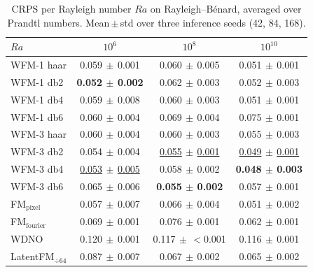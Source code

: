 \begin{table}[ht]
\centering
\caption{CRPS per Rayleigh number $Ra$ on Rayleigh--B\'enard, averaged over Prandtl numbers. Mean\,$\pm$\,std over three inference seeds (42, 84, 168).}
\label{tab:ablation_rb_crps_ra}
\begin{tabular}{lccc}
\toprule
$Ra$ & $10^{6}$ & $10^{8}$ & $10^{10}$ \\
\midrule
WFM-1 haar & 0.059{\scriptsize$\,\pm\,$0.001} & 0.060{\scriptsize$\,\pm\,$0.005} & 0.051{\scriptsize$\,\pm\,$0.001} \\
WFM-1 db2 & \textbf{0.052{\scriptsize$\,\pm\,$0.002}} & 0.062{\scriptsize$\,\pm\,$0.003} & 0.052{\scriptsize$\,\pm\,$0.003} \\
WFM-1 db4 & 0.059{\scriptsize$\,\pm\,$0.008} & 0.060{\scriptsize$\,\pm\,$0.003} & 0.051{\scriptsize$\,\pm\,$0.001} \\
WFM-1 db6 & 0.060{\scriptsize$\,\pm\,$0.004} & 0.069{\scriptsize$\,\pm\,$0.004} & 0.075{\scriptsize$\,\pm\,$0.001} \\
\midrule
WFM-3 haar & 0.060{\scriptsize$\,\pm\,$0.004} & 0.060{\scriptsize$\,\pm\,$0.003} & 0.055{\scriptsize$\,\pm\,$0.003} \\
WFM-3 db2 & 0.054{\scriptsize$\,\pm\,$0.004} & \underline{0.055{\scriptsize$\,\pm\,$0.001}} & \underline{0.049{\scriptsize$\,\pm\,$0.001}} \\
WFM-3 db4 & \underline{0.053{\scriptsize$\,\pm\,$0.005}} & 0.058{\scriptsize$\,\pm\,$0.002} & \textbf{0.048{\scriptsize$\,\pm\,$0.003}} \\
WFM-3 db6 & 0.065{\scriptsize$\,\pm\,$0.006} & \textbf{0.055{\scriptsize$\,\pm\,$0.002}} & 0.057{\scriptsize$\,\pm\,$0.001} \\
\midrule
FM$_\text{pixel}$ & 0.057{\scriptsize$\,\pm\,$0.007} & 0.066{\scriptsize$\,\pm\,$0.004} & 0.051{\scriptsize$\,\pm\,$0.002} \\
FM$_\text{fourier}$ & 0.069{\scriptsize$\,\pm\,$0.001} & 0.076{\scriptsize$\,\pm\,$0.001} & 0.062{\scriptsize$\,\pm\,$0.001} \\
WDNO & 0.120{\scriptsize$\,\pm\,$0.001} & 0.117{\scriptsize$\,\pm\,$$<$0.001} & 0.116{\scriptsize$\,\pm\,$0.001} \\
LatentFM$_{\div 64}$ & 0.087{\scriptsize$\,\pm\,$0.007} & 0.067{\scriptsize$\,\pm\,$0.002} & 0.065{\scriptsize$\,\pm\,$0.002} \\
\bottomrule
\end{tabular}
\end{table}

